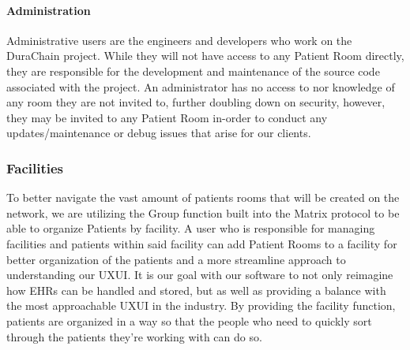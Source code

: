 \documentclass[letterpaper]{article}
\begin{document}
  \paragraph{Administration}
  Administrative users are the engineers and developers who work on the DuraChain project. While they will not have access to any Patient Room directly, they are responsible for the development and maintenance of the source code associated with the project. An administrator has no access to nor knowledge of any room they are not invited to, further doubling down on security, however, they may be invited to any Patient Room in-order to conduct any updates/maintenance or debug issues that arise for our clients.
%
%
%
\subsubsection{Facilities}
To better navigate the vast amount of patients rooms that will be created on the network, we are utilizing the Group function built into the Matrix protocol to be able to organize Patients by facility. A user who is responsible for managing facilities and patients within said facility can add Patient Rooms to a facility for better organization of the patients and a more streamline approach to understanding our UXUI. It is our goal with our software to not only reimagine how EHRs can be handled and stored, but as well as providing a balance with the most approachable UXUI in the industry. By providing the facility function, patients are organized in a way so that the people who need to quickly sort through the patients they’re working with can do so.
%
\end{document}
